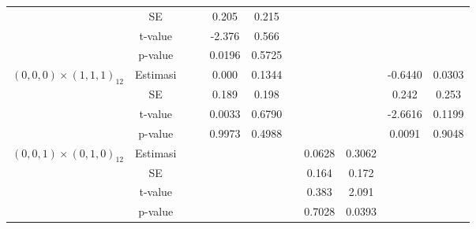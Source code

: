 \begin{enumerate}[label=\alph*.]
\begin{longtable}{|c|c|c|c|c|c|c|c|c|c|c|}
            & SE
            & {} & {}
            & {0.205} & {0.215} & {}
            & {} & {}
            & {} & {} \\ \cline{2-11}

            & t-value
            & {} & {}
            & {-2.376} & {0.566} & {}
            & {} & {}
            & {} & {} \\ \cline{2-11}

            & p-value
            & {} & {}
            & {0.0196} & {0.5725} & {}
            & {} & {}
            & {} & {} \\ \hline

            \multirow{4}{*}{$(0,0,0)\times(1,1,1)_{12}$}
            & Estimasi
            & {} & {}
            & {0.000} & {0.1344} & {}
            & {} & {}
            & {-0.6440} & {0.0303} \\ \cline{2-11}

            & SE
            & {} & {}
            & {0.189} & {0.198} & {}
            & {} & {}
            & {0.242} & {0.253} \\ \cline{2-11}

            & t-value
            & {} & {}
            & {0.0033} & {0.6790} & {}
            & {} & {}
            & {-2.6616} & {0.1199} \\ \cline{2-11}

            & p-value
            & {} & {}
            & {0.9973} & {0.4988} & {}
            & {} & {}
            & {0.0091} & {0.9048} \\ \hline

            \multirow{4}{*}{$(0,0,1)\times(0,1,0)_{12}$}
            & Estimasi
            & {} & {}
            & {} & {} & {}
            & {0.0628} & {0.3062}
            & {} & {} \\ \cline{2-11}

            & SE
            & {} & {}
            & {} & {} & {}
            & {0.164} & {0.172}
            & {} & {} \\ \cline{2-11}

            & t-value
            & {} & {}
            & {} & {} & {}
            & {0.383} & {2.091}
            & {} & {} \\ \cline{2-11}

            & p-value
            & {} & {}
            & {} & {} & {}
            & {0.7028} & {0.0393}
            & {} & {} \\ \hline


\end{longtable}
\end{enumerate}
